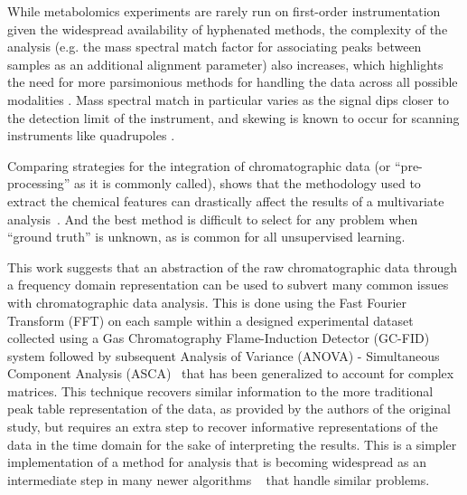 \documentclass[preprint,12pt]{elsarticle}
\begin{document}
While metabolomics experiments are rarely run on first-order instrumentation given the widespread availability of hyphenated methods, the complexity of the analysis (e.g. the mass spectral match factor for associating peaks between samples as an additional alignment parameter) also increases, which highlights the need for more parsimonious methods for handling the data across all possible modalities \cite{smith1995handbook}. Mass spectral match in particular varies as the signal dips closer to the detection limit of the instrument, and skewing is known to occur for scanning instruments like quadrupoles \cite{samokhin2018spectral}.

Comparing strategies for the integration of chromatographic data (or ``pre-processing'' as it is commonly called), shows that the methodology used to extract the chemical features can drastically affect the results of a multivariate analysis~\cite{weggler2021unique}. And the best method is difficult to select for any problem when ``ground truth'' is unknown, as is common for all unsupervised learning.

This work suggests that an abstraction of the raw chromatographic data through a frequency domain representation can be used to subvert many common issues with chromatographic data analysis. This is done using the Fast Fourier Transform (FFT) on each sample within a designed experimental dataset collected using a Gas Chromatography Flame-Induction Detector (GC-FID) system followed by subsequent Analysis of Variance (ANOVA) - Simultaneous Component Analysis (ASCA)~\cite{smilde2005anova} that has been generalized to account for complex matrices. This technique recovers similar information to the more traditional peak table representation of the data, as provided by the authors of the original study, but requires an extra step to recover informative representations of the data in the time domain for the sake of interpreting the results. This is a simpler implementation of a method for analysis that is becoming widespread as an intermediate step in many newer algorithms ~\cite{schneide2023shift,schneide2024shift,yu2023parasias} that handle similar problems.

\end{document}
